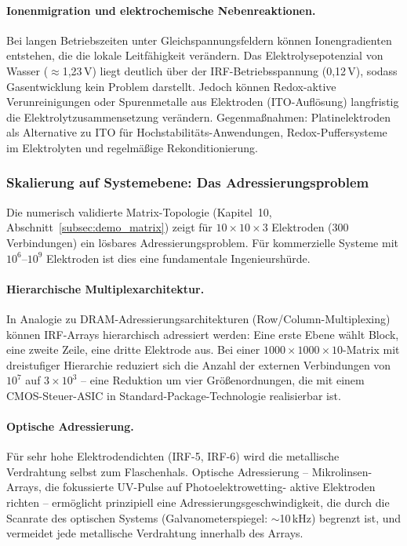 ﻿\documentclass[a4paper,12pt]{scrreprt}
\theoremstyle{definition}
\begin{document}
\paragraph{Ionenmigration und elektrochemische Nebenreaktionen.}
Bei langen Betriebszeiten unter Gleichspannungsfeldern können
Ionengradienten entstehen, die die lokale Leitfähigkeit verändern.
Das Elektrolysepotenzial von Wasser ($\approx$1,23\,V) liegt
deutlich über der IRF-Betriebsspannung (0,12\,V), sodass
Gasentwicklung kein Problem darstellt. Jedoch können Redox-aktive
Verunreinigungen oder Spurenmetalle aus Elektroden (ITO-Auflösung)
langfristig die Elektrolytzusammensetzung verändern. Gegenmaßnahmen:
Platinelektroden als Alternative zu ITO für Hochstabilitäts-Anwendungen,
Redox-Puffersysteme im Elektrolyten und regelmäßige Rekonditionierung.

\subsubsection{Skalierung auf Systemebene: Das Adressierungsproblem}
\label{subsubsec:adressierung}

Die numerisch validierte Matrix-Topologie (Kapitel~10,
Abschnitt~\ref{subsec:demo_matrix}) zeigt für $10 \times 10 \times 3$
Elektroden (300 Verbindungen) ein lösbares Adressierungsproblem.
Für kommerzielle Systeme mit $10^6$--$10^9$ Elektroden ist dies
eine fundamentale Ingenieurshürde.

\paragraph{Hierarchische Multiplexarchitektur.}
In Analogie zu DRAM-Adressierungsarchitekturen (Row/Column-Multiplexing)
können IRF-Arrays hierarchisch adressiert werden: Eine erste Ebene
wählt Block, eine zweite Zeile, eine dritte Elektrode aus. Bei
einer $1000 \times 1000 \times 10$-Matrix mit dreistufiger Hierarchie
reduziert sich die Anzahl der externen Verbindungen von $10^7$ auf
$3 \times 10^3$ -- eine Reduktion um vier Größenordnungen, die mit
einem CMOS-Steuer-ASIC in Standard-Package-Technologie realisierbar ist.

\paragraph{Optische Adressierung.}
Für sehr hohe Elektrodendichten (IRF-5, IRF-6) wird die metallische
Verdrahtung selbst zum Flaschenhals. Optische Adressierung --
Mikrolinsen-Arrays, die fokussierte UV-Pulse auf Photoelektrowetting-
aktive Elektroden richten -- ermöglicht prinzipiell eine
Adressierungsgeschwindigkeit, die durch die Scanrate des optischen
Systems (Galvanometerspiegel: $\sim$10\,kHz) begrenzt ist, und
vermeidet jede metallische Verdrahtung innerhalb des Arrays.
\end{document}
